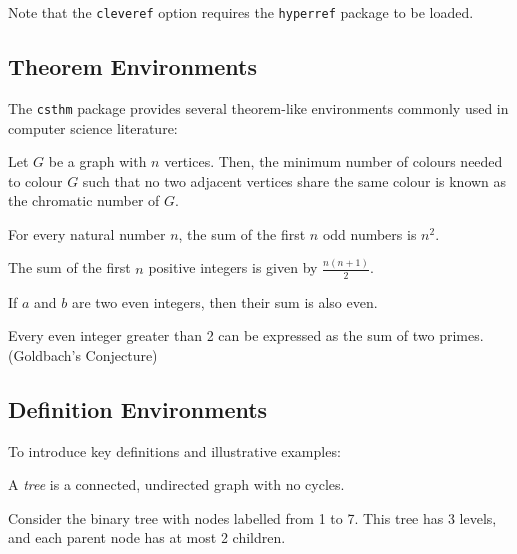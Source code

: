 \documentclass{article}
\begin{document}
Note that the \texttt{cleveref} option requires the \texttt{hyperref} package to be loaded.

\subsection{Theorem Environments}

The \texttt{csthm} package provides several theorem-like environments commonly used in computer science literature:

\begin{theorem}
Let \( G \) be a graph with \( n \) vertices. Then, the minimum number of colours needed to colour \( G \) such that no two adjacent vertices share the same colour is known as the chromatic number of \( G \).
\end{theorem}

\begin{lemma}
For every natural number \( n \), the sum of the first \( n \) odd numbers is \( n^2 \).
\end{lemma}

\begin{corollary}
The sum of the first \( n \) positive integers is given by \( \frac{n(n+1)}{2} \).
\end{corollary}

\begin{proposition}
If \( a \) and \( b \) are two even integers, then their sum is also even.
\end{proposition}

\begin{conjecture}
Every even integer greater than 2 can be expressed as the sum of two primes. (Goldbach's Conjecture)
\end{conjecture}

\subsection{Definition Environments}

To introduce key definitions and illustrative examples:

\begin{definition}
A \textit{tree} is a connected, undirected graph with no cycles.
\end{definition}

\begin{example}
Consider the binary tree with nodes labelled from 1 to 7. This tree has 3 levels, and each parent node has at most 2 children.
\end{example}
\end{document}
